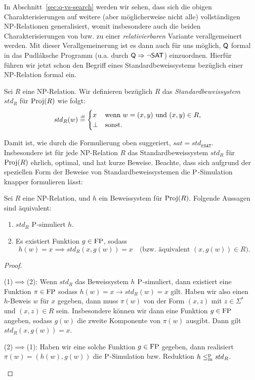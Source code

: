 In Abschnitt~\ref{sec:q-vs-search} werden wir sehen, dass sich die obigen Charakterisierungen auf weitere (aber möglicherweise nicht alle) vollständigen NP-Relationen generalisiert, womit insbesondere auch die beiden Charakterisierungen von \citeauthor{fenner_inverting_2003} bzw. \citeauthor{kobler_is_2000} zu einer \emph{relativierbaren} Variante verallgemeinert werden.
Mit dieser Verallgemeinerung ist es dann auch für uns möglich, $\hQ$ formal in das Pudláksche Programm (u.a. durch $\hQ\Rightarrow \neg\hSAT$) einzuordnen. Hierfür führen wir jetzt schon den Begriff eines Standardbeweissystems bezüglich einer NP-Relation formal ein.

\begin{definition}
    Sei $R$ eine NP-Relation. Wir definieren bezüglich $R$ das \emph{Standardbeweissystem} $\mathit{std}_R$ für $\Proj(R)$ wie folgt:
    \[ \mathit{std}_R(w) \defeq \begin{cases} x & \text{wenn $w=(x,y)$ und $(x,y)\in R$,}\\
    \bot & \text{sonst}.\end{cases} \qedhere \] 
\end{definition}
Damit ist, wie durch die Formulierung oben suggeriert, $\mathit{sat}=\mathit{std}_{\mathtt{rSAT}}$.
Insbesondere ist für jede NP-Relation $R$ das Standardbeweissystem $\mathit{std}_R$ für $\Proj(R)$ ehrlich, optimal, und hat kurze Beweise.
Beachte, dass sich aufgrund der speziellen Form der Beweise von Standardbeweissystemen die $\P$-Simulation knapper formulieren lässt:
\begin{observation}\label{obs:simulation-of-spps}
    Sei $R$ eine NP-Relation, und $h$ ein Beweissystem für $\Proj(R)$. Folgende Aussagen sind äquivalent:
    \begin{enumerate}
        \item $\mathit{std}_R$ $\P$-simuliert $h$.
        \item Es existiert Funktion $g\in\FP$, sodass
            \[ h(w)=x \implies \mathit{std}_R(x, g(w))=x \quad\text{(bzw. äquivalent $(x, g(w))\in R$)}. \]
    \end{enumerate}
\end{observation}
\begin{proof}
    \begin{prooflist}
    (1)$\implies$(2): Wenn $\mathit{std}_R$ das Beweissystem $h$ $\P$-simuliert, dann existiert eine Funktion $\pi\in\FP$ sodass $h(w)=x\rightarrow \mathit{std}_R(w)=x$ gilt.
    Haben wir also einen $h$-Beweis $w$ für $x$ gegeben, dann muss $\pi(w)$ von der Form $(x, z)$ mit $z\in\Sigma^*$ und $(x,z)\in R$ sein. Insbesondere können wir dann eine Funktion $g\in\FP$ angeben, sodass $g(w)$ die zweite Komponente von $\pi(w)$ ausgibt. Dann gilt $\mathit{std}_R(x, g(w))=x$.

    (2)$\implies$(1): Haben wir eine solche Funktion $g\in\FP$ gegeben, dann realisiert $\pi(w)=(h(w), g(w))$ die $\P$-Simulation bzw. Reduktion $h\leqmp \mathit{std}_R$.
    \end{prooflist}
\end{proof}


